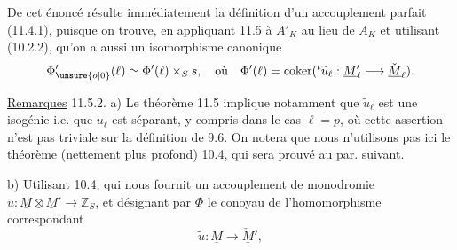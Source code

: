 De cet énoncé résulte immédiatement la définition d'un accouplement parfait (11.4.1), puisque on trouve, en appliquant 11.5 à $A'_K$ au lieu de $A_K$ et utilisant (10.2.2), qu'on a aussi un isomorphisme canonique
\[
\Phi'_{\unsure{o|0}}(\ell)\simeq\Phi'(\ell)\times_Ss,\quad\text{où}\quad
\Phi'(\ell)=\operatorname{coker}({}^t\widetilde u_\ell:\underline M'_\ell\longrightarrow\check{\underline M}_\ell).
\]

\uline{Remarques} 11.5.2. a) Le théorème 11.5 implique notamment que $\widetilde u_\ell$ est une isogénie i.e. que $u_\ell$ est séparant, y compris dans le cas $\ell=p$, où cette assertion n'est pas triviale sur la définition de 9.6. On notera que nous n'utilisons pas ici le théorème (nettement plus profond) 10.4, qui sera prouvé au par. suivant.

b) Utilisant 10.4, qui nous fournit un accouplement de monodromie $u:\underline M\otimes\underline M'\longrightarrow\mathbb Z_S$, et désignant par $\Phi$ le conoyau de l'homomorphisme correspondant
\[
 \widetilde u:\underline M\longrightarrow\check{\underline M}',
\]

